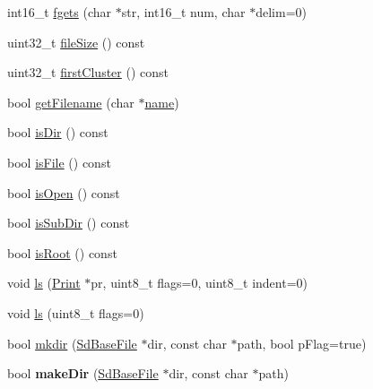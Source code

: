 \begin{DoxyCompactItemize}
\item 
int16\-\_\-t \hyperlink{class_sd_base_file_af3081927d174cf7558953769f3dec7a3}{fgets} (char $\ast$str, int16\-\_\-t num, char $\ast$delim=0)
\item 
uint32\-\_\-t \hyperlink{class_sd_base_file_a134f35678a76fc9be1efe2c290483814}{file\-Size} () const 
\item 
uint32\-\_\-t \hyperlink{class_sd_base_file_a58d3a00e51805ee03012cb2c86414796}{first\-Cluster} () const 
\item 
bool \hyperlink{class_sd_base_file_a6ee2b08977084de3a31d1509d7a8e6af}{get\-Filename} (char $\ast$\hyperlink{_sd_fat_structs_8h_a30308c9b983377042fd2cc8900454fb1}{name})
\item 
bool \hyperlink{class_sd_base_file_a50918fb073b73ccef883870dfb705d74}{is\-Dir} () const 
\item 
bool \hyperlink{class_sd_base_file_aee673f3d8abf2d1bfd841274900fd40a}{is\-File} () const 
\item 
bool \hyperlink{class_sd_base_file_a3c7351cec1380d07f9e4b3ec96b2b1ff}{is\-Open} () const 
\item 
bool \hyperlink{class_sd_base_file_a8a0d7f6a7297d2b9772c4033b2296d56}{is\-Sub\-Dir} () const 
\item 
bool \hyperlink{class_sd_base_file_adb67b2a249620b49f23a8bc03cbdb3b0}{is\-Root} () const 
\item 
void \hyperlink{class_sd_base_file_ab4ab4da84ebfc68fe4c3035d156fab59}{ls} (\hyperlink{class_print}{Print} $\ast$pr, uint8\-\_\-t flags=0, uint8\-\_\-t indent=0)
\item 
void \hyperlink{class_sd_base_file_afaff0496e55019ed50d950230dd9c4f0}{ls} (uint8\-\_\-t flags=0)
\item 
bool \hyperlink{class_sd_base_file_a204a0b140efe0da51252fab0fd3bddcc}{mkdir} (\hyperlink{class_sd_base_file}{Sd\-Base\-File} $\ast$dir, const char $\ast$path, bool p\-Flag=true)
\item 
\hypertarget{class_sd_base_file_a920b65592f1ba58c38c01e0518ae94c9}{bool {\bfseries make\-Dir} (\hyperlink{class_sd_base_file}{Sd\-Base\-File} $\ast$dir, const char $\ast$path)}\label{class_sd_base_file_a920b65592f1ba58c38c01e0518ae94c9}


\end{DoxyCompactItemize}
